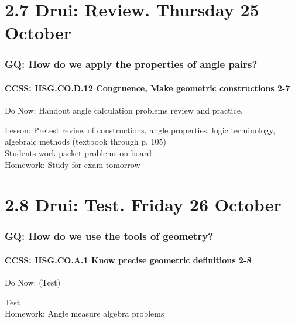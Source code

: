\documentclass{beamer}
\begin{document}
\section{2.7 Drui: Review. Thursday 25 October}
  \frame
  {
  \frametitle{GQ: How do we apply the properties of angle pairs?}
  \framesubtitle{CCSS: HSG.CO.D.12 Congruence, Make geometric constructions  \alert{2-7}}

  \begin{block}{Do Now: Handout angle calculation problems review and practice.}
  \end{block}
  Lesson: Pretest review of constructions, angle properties, logic terminology, algebraic methods (textbook through p. 105)\\
  Students work packet problems on board\\
  \vspace{0.5cm}
  Homework: Study for \alert{exam tomorrow}
}

\section{2.8 Drui: Test. Friday 26 October}
        \frame
        {
          \frametitle{GQ: How do we use the tools of geometry?}
          \framesubtitle{CCSS: HSG.CO.A.1 Know precise geometric definitions  \alert{2-8}}

          \begin{block}{Do Now: (Test)}
          \end{block}
          Test\\
          \vspace{1cm}
          Homework: Angle measure algebra problems
        }
\end{document}
